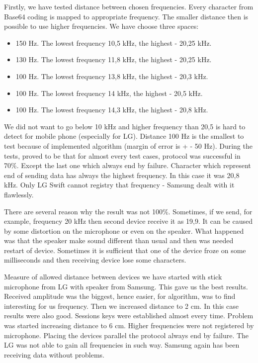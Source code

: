 \documentclass[11pt,titlepage]{article}
\theoremstyle{plain}
\begin{document}
Firstly, we have tested distance between chosen frequencies. Every character from Base64 coding is mapped to appropriate frequency. The smaller distance then is possible to use higher frequencies. We have choose three spaces:
\begin{itemize}
\item 150 Hz. The lowest frequency 10,5 kHz, the highest - 20,25 kHz.
\item 130 Hz. The lowest frequency 11,8 kHz, the highest - 20,25 kHz.
\item 100 Hz. The lowest frequency 13,8 kHz, the highest - 20,3 kHz.
\item 100 Hz. The lowest frequency 14 kHz, the highest - 20,5 kHz.
\item 100 Hz. The lowest frequency 14,3 kHz, the highest - 20,8 kHz.
\end{itemize}
We did not want to go below 10 kHz and higher frequency than 20,5 is hard to detect for mobile phone (especially for LG). Distance 100 Hz is the smallest to test because of implemented algorithm (margin of error is + - 50 Hz). During the tests, proved to be that for almost every test cases, protocol was successful in 70\%. Except the last one which always end by failure. Character which represent end of sending data has always the highest frequency. In this case it was 20,8 kHz. Only LG Swift cannot registry that frequency - Samsung dealt with it flawlessly.

\vspace{5mm}

There are several reason why the result was not 100\%. Sometimes, if we send, for example, frequency 20 kHz then second device receive it as 19,9. It can be caused by some distortion on the microphone or even on the speaker. What happened was that the speaker make sound different than usual and then was needed restart of device. Sometimes it is sufficient that one of the device froze on some milliseconds and then receiving device lose some characters. 

\vspace{5mm}

Measure of allowed distance between devices we have started with stick microphone from LG with speaker from Samsung. This gave us the best results. Received amplitude was the biggest, hence easier, for algorithm, was to find interesting for us frequency. Then we increased distance to 2 cm. In this case results were also good. Sessions keys were established almost every time. Problem was started increasing distance to 6 cm. Higher frequencies were not registered by microphone. Placing the devices parallel the protocol always end by failure. The LG was not able to gain all frequencies in such way. Samsung again has been receiving data without problems. 
\end{document}
